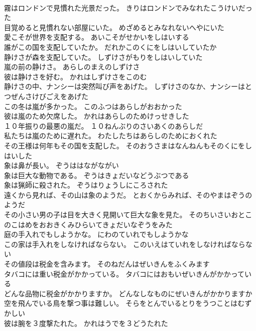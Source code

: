 \documentclass[8pt]{extreport}
\begin{document}
\begin{CJK}{UTF8}{min}
\\	霧はロンドンで見慣れた光景だった。	きりはロンドンでみなれたこうけいだった 
\\	目覚めると見慣れない部屋にいた。	めざめるとみなれないへやにいた 
\\	愛こそが世界を支配する。	あいこそがせかいをしはいする 
\\	誰がこの国を支配していたか。	だれかこのくにをしはいしていたか 
\\	静けさが森を支配していた。	しずけさがもりをしはいしていた 
\\	嵐の前の静けさ。	あらしのまえのしずけさ 
\\	彼は静けさを好む。	かれはしずけさをこのむ 
\\	静けさの中、ナンシーは突然叫び声をあげた。	しずけさのなか、ナンシーはとつぜんさけびごえをあげた 
\\	この冬は嵐が多かった。	このふつはあらしがおおかった 
\\	彼は嵐のため欠席した。	かれはあらしのためけっせきした 
\\	１０年振りの最悪の嵐だ。	１０ねんぶりのさいあくのあらしだ 
\\	私たちは嵐のために遅れた。	わたしたちはあらしのためにおくれた 
\\	その王様は何年もその国を支配した。	そのおうさまはなんねんもそのくにをしはいした 
\\	象は鼻が長い。	ぞうははながながい 
\\	象は巨大な動物である。	ぞうはきょだいなどうぶつである 
\\	象は猟師に殺された。	ぞうはりょうしにころされた 
\\	遠くから見れば、その山は象のようだ。	とおくからみれば、そのやまはぞうのようだ 
\\	その小さい男の子は目を大きく見開いて巨大な象を見た。	そのちいさいおとこのこはめをおおきくみひらいてきょだいなぞうをみた 
\\	庭の手入れでもしようかな。	にわのていれでもしようかな 
\\	この家は手入れをしなければならない。	このいえはていれをしなければならない 
\\	その値段は税金を含みます。	そのねだんはぜいきんをふくみます 
\\	タバコには重い税金がかかっている。	タバコにはおもいぜいきんがかかっている 
\\	どんな品物に税金がかかりますか。	どんなしなものにぜいきんがかかりますか 
\\	空を飛んでいる鳥を撃つ事は難しい。	そらをとんでいるとりをうつことはむずかしい 
\\	彼は腕を３度撃たれた。	かれはうでを３どうたれた 

\end{CJK}
\end{document}

